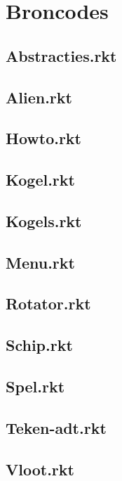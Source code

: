 \documentclass[]{article}
\begin{document}
\section{Broncodes}

\subsection{Abstracties.rkt}

\subsection{Alien.rkt}

\subsection{Howto.rkt}

\subsection{Kogel.rkt}

\subsection{Kogels.rkt}

\subsection{Menu.rkt}

\subsection{Rotator.rkt}

\subsection{Schip.rkt}

\subsection{Spel.rkt}

\subsection{Teken-adt.rkt}

\subsection{Vloot.rkt}

\end{document}
